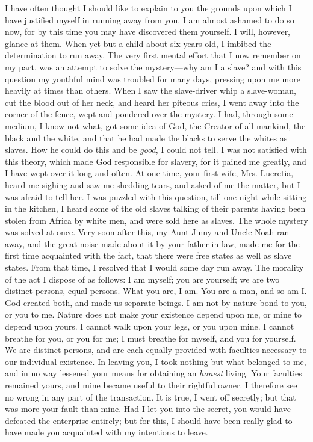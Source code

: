 I have often thought I should like to explain to you the grounds
{\protect\hypertarget{423}{}{}}upon which I have justified myself in
running away from you. I am almost ashamed to do so now, for by this
time you may have discovered them yourself. I will, however, glance at
them. When yet but a child about six years old, I imbibed the
determination to run away. The very first mental effort that I now
remember on my part, was an attempt to solve the mystery---why am I a
slave? and with this question my youthful mind was troubled for many
days, pressing upon me more heavily at times than others. When I saw the
slave-driver whip a slave-woman, cut the blood out of her neck, and
heard her piteous cries, I went away into the corner of the fence, wept
and pondered over the mystery. I had, through some medium, I know not
what, got some idea of God, the Creator of all mankind, the black and
the white, and that he had made the blacks to serve the whites as
slaves. How he could do this and be \emph{good}, I could not tell. I was
not satisfied with this theory, which made God responsible for slavery,
for it pained me greatly, and I have wept over it long and often. At one
time, your first wife, Mrs. Lucretia, heard me sighing and saw me
shedding tears, and asked of me the matter, but I was afraid to tell
her. I was puzzled with this question, till one night while sitting in
the kitchen, I heard some of the old slaves talking of their parents
having been stolen from Africa by white men, and were sold here as
slaves. The whole mystery was solved at once. Very soon after this, my
Aunt Jinny and Uncle Noah ran away, and the great noise made about it by
your father-in-law, made me for the first time acquainted with the fact,
that there were free states as well as slave states. From that time, I
resolved that I would some day run away. The morality of the act I
dispose of as follows: I am myself; you are yourself; we are two
distinct persons, equal persons. What you are, I am. You are a man, and
so am I. God created both, and made us separate beings. I am not by
nature bond to you, or you to me. Nature does not make your existence
depend upon me, or mine to depend upon yours. I cannot walk upon your
legs, or you upon mine. I cannot breathe for you, or you for me; I must
breathe for myself, and you for yourself. We are distinct persons, and
are each equally provided with faculties necessary to our individual
existence. In leaving you, I took nothing but what belonged to me, and
in no way lessened your means for obtaining an \emph{honest} living.
Your faculties remained yours, and mine became useful to their rightful
owner. I therefore see no wrong in any part of the transaction. It is
true, I went off {\protect\hypertarget{424}{}{}}secretly; but that was
more your fault than mine. Had I let you into the secret, you would have
defeated the enterprise entirely; but for this, I should have been
really glad to have made you acquainted with my intentions to leave.

